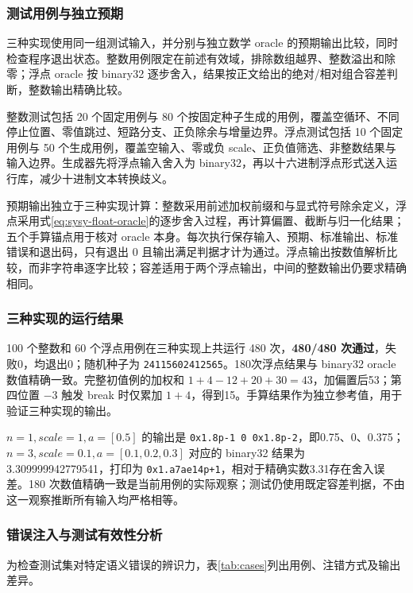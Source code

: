 \subsubsection{测试用例与独立预期}
\label{sec:sysy-test-design}
三种实现使用同一组测试输入，并分别与独立数学 oracle 的预期输出比较，同时检查程序退出状态。整数用例限定在前述有效域，排除数组越界、整数溢出和除零；浮点 oracle 按 binary32 逐步舍入，结果按正文给出的绝对/相对组合容差判断，整数输出精确比较。

整数测试包括 20 个固定用例与 80 个按固定种子生成的用例，覆盖空循环、不同停止位置、零值跳过、短路分支、正负除余与增量边界。浮点测试包括 10 个固定用例与 50 个生成用例，覆盖空输入、零或负 scale、正负值筛选、非整数结果与输入边界。生成器先将浮点输入舍入为 binary32，再以十六进制浮点形式送入运行库，减少十进制文本转换歧义。

预期输出独立于三种实现计算：整数采用前述加权前缀和与显式符号除余定义，浮点采用式\eqref{eq:sysy-float-oracle}的逐步舍入过程，再计算偏置、截断与归一化结果；五个手算锚点用于核对 oracle 本身。每次执行保存输入、预期、标准输出、标准错误和退出码，只有退出 0 且输出满足判据才计为通过。浮点输出按数值解析比较，而非字符串逐字比较；容差适用于两个浮点输出，中间的整数输出仍要求精确相同。

\subsubsection{三种实现的运行结果}
\label{sec:sysy-run-results}
100 个整数和 60 个浮点用例在三种实现上共运行 480 次，\textbf{480/480 次通过}，失败0，均退出0；随机种子为 \texttt{24115602412565}。180次浮点结果与 binary32 oracle 数值精确一致。完整初值例的加权和 $1+4-12+20+30=43$，加偏置后53；第四位置 $-3$ 触发 break 时仅累加 $1+4$，得到15。手算结果作为独立参考值，用于验证三种实现的输出。

$n=1,scale=1,a=[0.5]$ 的输出是 \texttt{0x1.8p-1 0 0x1.8p-2}，即0.75、0、0.375；$n=3,scale=0.1,a=[0.1,0.2,0.3]$ 对应的 binary32 结果为3.309999942779541，打印为 \texttt{0x1.a7ae14p+1}，相对于精确实数3.31存在舍入误差。180 次数值精确一致是当前用例的实际观察；测试仍使用既定容差判据，不由这一观察推断所有输入均严格相等。

\subsubsection{错误注入与测试有效性分析}
\label{sec:sysy-mutation-analysis}

为检查测试集对特定语义错误的辨识力，表\ref{tab:cases}列出用例、注错方式及输出差异。

